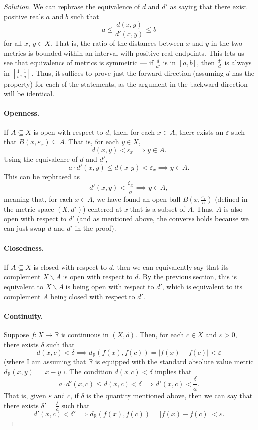 \documentclass[11pt]{scrartcl}
\providecommand{\eps}{\varepsilon}
\providecommand{\RR}{\mathbb R}
\theoremstyle{problem}
\theoremstyle{remark}
\newenvironment{soln}{\begin{proof}[Solution]}{\end{proof}}
\begin{document}
\begin{soln}
	We can rephrase the equivalence of $d$ and $d'$ as saying
	that there exist positive reals $a$ and $b$ such that
	\[a \le \frac{d(x, y)}{d'(x, y)} \le b\]
	for all $x,\,y\in X$. That is, the ratio of the distances
	between $x$ and $y$ in the two metrics is bounded within
	an interval with positive real endpoints.
	This lets us see that equivalence of metrics is symmetric ---
	if $\frac{d}{d'}$ is in $[a, b]$,
	then $\frac{d'}{d}$ is always in $[\frac 1b, \frac1a]$.
	Thus, it suffices to prove just the forward direction
	(assuming $d$ has the property) for each of the statements,
	as the argument in the backward direction will be identical.
	
	\paragraph{Openness.}
	If $A\subseteq X$ is open with respect to $d$, then, for each $x\in A$,
	there exists an $\eps$ such that $B(x,\eps_x)\subseteq A$.
	That is, for each $y\in X$,
	\[d(x, y) < \eps_x \implies y \in A.\]
	Using the equivalence of $d$ and $d'$,
	\[a\cdot d'(x, y)\le d(x, y) < \eps_x\implies y \in A.\]
	This can be rephrased as
	\[d'(x, y) < \frac{\eps_x}{a}\implies y \in A,\]
	meaning that, for each $x\in A$, we have found an open ball
	$B(x, \frac{\eps_x}{a})$ (defined in the metric space $(X, d')$)
	centered at $x$ that is a subset of $A$.
	Thus, $A$ is also open with respect to $d'$
	(and as mentioned above, the converse holds
	because we can just swap $d$ and $d'$ in the proof).
	
	\paragraph{Closedness.}
	If $A\subseteq X$ is closed with respect to $d$,
	then we can equivalently say that its complement
	$X\smallsetminus A$ is open with respect to $d$.
	By the previous section, this is equivalent to
	$X\smallsetminus A$ is being open with respect to $d'$,
	which is equivalent to its complement $A$
	being closed with respect to $d'$.
	
	\paragraph{Continuity.}
	Suppose $f\colon X\to \RR$ is continuous in $(X, d)$.
	Then, for each $c\in X$ and $\eps > 0$, there exists $\delta$ such that
	\[d(x, c) < \delta \implies d_{\RR}(f(x), f(c)) = |f(x) - f(c)| < \eps\]
	(where I am assuming that $\RR$ is equipped with the standard
	absolute value metric $d_\RR(x, y) = |x - y|$).
	The condition $d(x, c) < \delta$ implies that
	\[a\cdot d'(x, c) \le d(x, c) < \delta \implies
	d'(x, c) < \frac{\delta}{a}.\]
	That is, given $\eps$ and $c$, if $\delta$ is the quantity mentioned above,
	then we can say that there exists $\delta' = \frac{\delta}{a}$ such that
	\[d'(x, c) < \delta' \implies d_{\RR}(f(x), f(c)) = |f(x) - f(c)| < \eps.\]
	

\end{soln}
\end{document}
